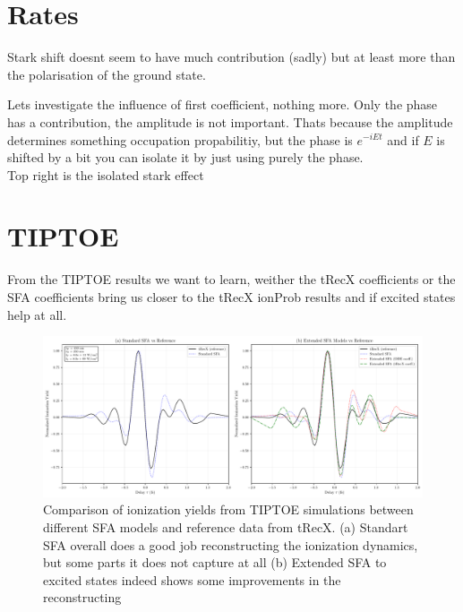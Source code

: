 \section{Rates}
Stark shift doesnt seem to have much contribution (sadly) but at least more than the polarisation of the ground state.

Lets investigate the influence of first coefficient, nothing more. Only the phase has a contribution, the amplitude is not important.
Thats because the amplitude determines something occupation propabilitiy, but the phase is $e^{-iEt}$ and if $E$ is shifted by a bit you can isolate it by just using purely the phase.\\
Top right is the isolated stark effect





\section{TIPTOE}
From the TIPTOE results we want to learn, weither the tRecX coefficients or the SFA coefficients bring us closer to the tRecX ionProb results and if excited states help at all.

\begin{figure}
    \centering
    \includegraphics[width=1\textwidth]{../ionModel/python/plotsTIPTOE/2plot_SFA-comparison_3.pdf}
    \caption{Comparison of ionization yields from TIPTOE simulations between different SFA models and reference data from tRecX. 
            (a) Standart SFA overall does a good job reconstructing the ionization dynamics, but some parts it does not capture at all 
            (b) Extended SFA to excited states indeed shows some improvements in the reconstructing }
    \label{fig:tiptoe_sfa_comparison}
\end{figure}

